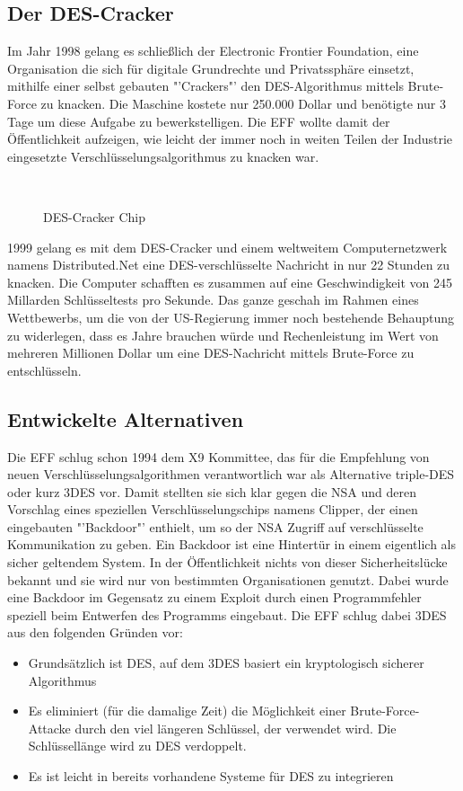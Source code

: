 \documentclass[
10pt, %
a4paper, %
oneside, %
headinclude,footinclude, %
BCOR5mm, %
]{scrartcl}
\begin{document}
\begin{1}[ht]
\subsection{Der DES-Cracker} 
Im Jahr 1998 gelang es schließlich der Electronic Frontier Foundation, eine Organisation die sich für digitale Grundrechte und Privatssphäre einsetzt, mithilfe einer selbst gebauten "'Crackers"' den DES-Algorithmus mittels Brute-Force zu knacken. Die Maschine kostete nur 250.000 Dollar und benötigte nur 3 Tage um diese Aufgabe zu bewerkstelligen. Die EFF wollte damit der Öffentlichkeit aufzeigen, wie leicht der immer noch in weiten Teilen der Industrie eingesetzte Verschlüsselungsalgorithmus zu knacken war.
\begin{figure}[tb]
\centering
{} \quad
{} \\
\caption[DES-Cracker.]{DES-Cracker Chip \footnotemark}
\label{fig:ChipBoard}
\end{figure}
1999 gelang es mit dem DES-Cracker und einem weltweitem Computernetzwerk namens Distributed.Net eine DES-verschlüsselte Nachricht in nur 22 Stunden zu knacken. Die Computer schafften es zusammen auf eine Geschwindigkeit von 245 Millarden Schlüsseltests pro Sekunde. Das ganze geschah im Rahmen eines Wettbewerbs, um die von der US-Regierung immer noch bestehende Behauptung zu widerlegen, dass es Jahre brauchen würde und Rechenleistung im Wert von mehreren Millionen Dollar um eine DES-Nachricht mittels Brute-Force zu entschlüsseln. \cite{15}
\subsection{Entwickelte Alternativen} 
Die EFF schlug schon 1994 dem X9 Kommittee, das für die Empfehlung von neuen Verschlüsselungsalgorithmen verantwortlich war als Alternative triple-DES oder kurz 3DES vor. Damit stellten sie sich klar gegen die NSA und deren Vorschlag eines speziellen Verschlüsselungschips namens Clipper, der einen eingebauten "'Backdoor"' enthielt, um so der NSA Zugriff auf verschlüsselte Kommunikation zu geben. Ein Backdoor ist eine Hintertür in einem eigentlich als sicher geltendem System. In der Öffentlichkeit nichts von dieser Sicherheitslücke bekannt und sie wird nur von bestimmten Organisationen genutzt. Dabei wurde eine Backdoor im Gegensatz zu einem Exploit durch einen Programmfehler speziell beim Entwerfen des Programms eingebaut. \cite{16}
Die EFF schlug dabei 3DES aus den folgenden Gründen vor: 
\begin{itemize}
\item Grundsätzlich ist DES, auf dem 3DES basiert ein kryptologisch sicherer Algorithmus
\item Es eliminiert (für die damalige Zeit) die Möglichkeit einer Brute-Force-Attacke durch den viel längeren Schlüssel, der verwendet wird. Die Schlüssellänge wird zu DES verdoppelt.
\item Es ist leicht in bereits vorhandene Systeme für  DES zu integrieren
\end{itemize} 
\cite{17}

\end{1}
\end{document}
